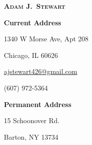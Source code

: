 
\begin{center}

    \textbf{\textsc{\Large Adam J.\ Stewart}}

\end{center}

\vspace{-12pt}

\begin{multicols}{3}

    \begin{flushleft}

        \textbf{Current Address}

        1340 W Morse Ave, Apt 208

        Chicago, IL 60626

    \end{flushleft}

    \columnbreak

    \begin{center}

        \href{mailto:ajstewart426@gmail.com}{ajstewart426@gmail.com}

        (607) 972-5364

    \end{center}

    \columnbreak

    \begin{flushright}

        \textbf{Permanent Address}

        15 Schoonover Rd.

        Barton, NY 13734

    \end{flushright}

\end{multicols}

